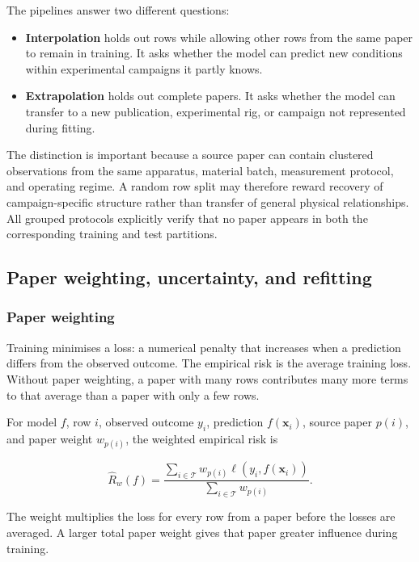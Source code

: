 The pipelines answer two different questions:

\begin{itemize}
  \item \textbf{Interpolation} holds out rows while allowing other rows from
  the same paper to remain in training. It asks whether the model can predict
  new conditions within experimental campaigns it partly knows.

  \item \textbf{Extrapolation} holds out complete papers. It asks whether the
  model can transfer to a new publication, experimental rig, or campaign not
  represented during fitting.
\end{itemize}

The distinction is important because a source paper can contain clustered
observations from the same apparatus, material batch, measurement protocol, and
operating regime. A random row split may therefore reward recovery of
campaign-specific structure rather than transfer of general physical
relationships. All grouped protocols explicitly verify that no paper appears
in both the corresponding training and test partitions.

\subsection{Paper weighting, uncertainty, and refitting}

\subsubsection{Paper weighting}

Training minimises a loss: a numerical penalty that increases when a prediction
differs from the observed outcome. The empirical risk is the average training
loss. Without paper weighting, a paper with many rows contributes many more
terms to that average than a paper with only a few rows.

For model \(f\), row \(i\), observed outcome \(y_i\), prediction
\(f(\mathbf{x}_i)\), source paper \(p(i)\), and paper weight \(w_{p(i)}\), the
weighted empirical risk is

\[
  \widehat R_w(f)=
  \frac{\sum_{i\in\mathcal{T}}w_{p(i)}
  \ell\!\left(y_i,f(\mathbf{x}_i)\right)}
  {\sum_{i\in\mathcal{T}}w_{p(i)}}.
\]

The weight multiplies the loss for every row from a paper before the losses are
averaged. A larger total paper weight gives that paper greater influence during
training.

